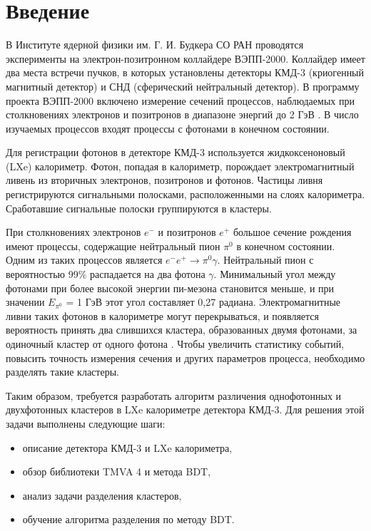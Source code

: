 \documentclass[14pt]{extarticle}
\begin{document}
	\setlength{\abovedisplayskip}{6pt}
	\setlength{\belowdisplayskip}{6pt}
	\setlength{\belowcaptionskip}{-15pt}
	\setcounter{page}{3}
	\thispagestyle{fancy}
	\tableofcontents
	\newpage
\section{Введение}
В Институте ядерной физики им. Г. И. Будкера СО РАН проводятся эксперименты на электрон-позитронном коллайдере ВЭПП-2000. Коллайдер имеет два места встречи пучков, в которых установлены детекторы КМД-3 (криогенный магнитный детектор) и СНД (сферический нейтральный детектор). В программу проекта ВЭПП-2000 включено измерение сечений процессов, наблюдаемых при столкновениях электронов и позитронов в диапазоне энергий до 2 ГэВ \cite{semenov}. В число изучаемых процессов входят процессы с фотонами в конечном состоянии.

Для регистрации фотонов в детекторе КМД-3 используется жидкоксеноновый (LXe) калориметр. Фотон, попадая в калориметр, порождает электромагнитный ливень из вторичных электронов, позитронов и фотонов. Частицы ливня регистрируются сигнальными полосками, расположенными на слоях калориметра. Сработавшие сигнальные полоски группируются в кластеры.

При столкновениях электронов $e^-$ и позитронов $e^+$ большое сечение рождения имеют процессы, содержащие нейтральный пион $\pi^0$ в конечном состоянии. Одним из таких процессов является $e^- e^+ \rightarrow \pi^0 \gamma$. Нейтральный пион с вероятностью 99\% распадается на два фотона $\gamma$. Минимальный угол между фотонами при более высокой энергии пи-мезона становится меньше, и при значении $E_{\pi^0}$ = 1 ГэВ этот угол составляет 0,27 радиана. Электромагнитные ливни таких фотонов в калориметре могут перекрываться, и появляется вероятность принять два слившихся кластера, образованных двумя фотонами, за одиночный кластер от одного фотона \cite{lakomov}. Чтобы увеличить статистику событий, повысить точность измерения сечения и других параметров процесса, необходимо разделять такие кластеры.

Таким образом, требуется разработать алгоритм различения однофотонных и двухфотонных кластеров в LXe калориметре детектора КМД-3. Для решения этой задачи выполнены следующие шаги:
\begin{itemize}
	\item описание детектора КМД-3 и LXe калориметра,
	\item обзор библиотеки TMVA 4 и метода BDT,
	\item анализ задачи разделения кластеров,
	\item обучение алгоритма разделения по методу BDT.
\end{itemize}
\end{document}
